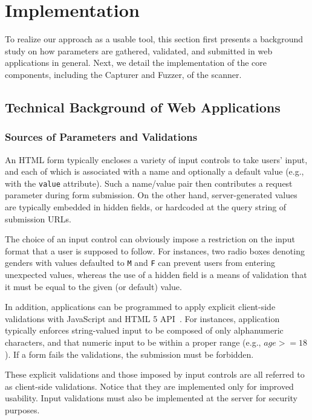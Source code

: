 \documentclass[letter]{sig-alternate-2013}
\begin{document}
 \section{Implementation}
\label{sec:crs_implementation}
To realize our approach as a usable tool, this section first presents a background study on how parameters are gathered, validated, and submitted in web applications in general. Next, we detail the implementation of the core components, including the Capturer and Fuzzer, of the scanner.

\subsection{Technical Background of Web Applications}
\label{sec:crs_techbackground}

\subsubsection{Sources of Parameters and Validations}

An HTML form typically encloses a variety of input controls to take users' input, and each of which is associated with a name and optionally a default value (e.g., with the \verb"value" attribute). Such a name/value pair then contributes a request parameter during form submission. On the other hand, server-generated values are typically embedded in hidden fields, or hardcoded at the query string of submission URLs.

The choice of an input control can obviously impose a restriction on the input format that a user is supposed to follow. For instances, two radio boxes denoting genders with values defaulted to \verb"M" and \verb"F" can prevent users from entering unexpected values, whereas the use of a hidden field is a means of validation that it must be equal to the given (or default) value.

In addition, applications can be programmed to apply explicit client-side validations with JavaScript and HTML 5 API~\cite{html5}. For instances, application typically enforces string-valued input to be composed of only alphanumeric characters, and that numeric input to be within a proper range (e.g., $age >= 18$). If a form fails the validations, the submission must be forbidden. 

These explicit validations and those imposed by input controls are all referred to as client-side validations. Notice that they are implemented only for improved usability. Input validations must also be implemented at the server for security purposes.
\end{document}
